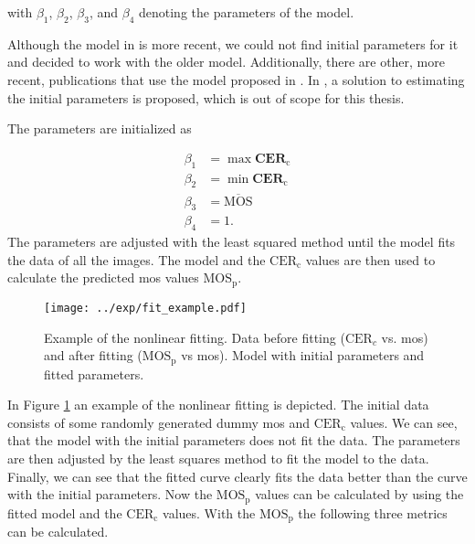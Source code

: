 with $\beta_{1}$, $\beta_{2}$, $\beta_{3}$, and $\beta_{4}$ denoting the parameters of the model.

Although the model in \cite{nonlin_fit_original_2003} is more recent, we could not find initial parameters for it and decided to work with the older model.
Additionally, there are other, more recent, publications \cite{ni_esim_2017, nonlin_fit_appl_2017, nonlin_fit_appl_2018, nonlin_fit_appl_2014, fsim_2011, nonlin_fit_appl_2015, doc_quality_survey_2023, iqa_database_2023, nonlin_fit_appl_2016} that use the model proposed in \cite{nonlin_fit_new_model_2006}.
In \cite{nonlin_fit_init_proof_2017}, a solution to estimating the initial parameters is proposed, which is out of scope for this thesis.


The parameters are initialized as
 
\begin{equation}
    \begin{aligned}
        \beta_{1} &= \max{\mathbf{CER}_{\text{c}}} \\
        \beta_{2} &= \min{\mathbf{CER}_{\text{c}}} \\
        \beta_{3} &= \overline{\text{MOS}} \\
        \beta_{4} &= 1.
    \end{aligned}
    \label{eq:nonlinear_init}
\end{equation}
The parameters are adjusted with the least squared method until the model fits the data of all the images.
The model and the $\text{CER}_{\text{c}}$ values are then used to calculate the predicted \gls{mos} values $\text{MOS}_{\text{p}}$.

\begin{figure}[h]
    \centering
    \texttt{[image: ../exp/fit\_example.pdf]}
    \caption{Example of the nonlinear fitting. Data before fitting ($\text{CER}_{c}$ vs. \gls{mos}) and after fitting ($\text{MOS}_{\text{p}}$ vs \gls{mos}). Model with initial parameters and fitted parameters.}
    \label{fig:nonlinear_fit}
\end{figure}

In Figure \ref{fig:nonlinear_fit} an example of the nonlinear fitting is depicted.
The initial data consists of some randomly generated dummy \gls{mos} and $\text{CER}_{\text{c}}$ values.
We can see, that the model with the initial parameters does not fit the data.
The parameters are then adjusted by the least squares method \cite{least_squares_1978} to fit the model to the data.
Finally, we can see that the fitted curve clearly fits the data better than the curve with the initial parameters.
Now the $\text{MOS}_{\text{p}}$ values can be calculated by using the fitted model and the $\text{CER}_{\text{c}}$ values.
With the $\text{MOS}_{\text{p}}$ the following three metrics \cite{iqa_survey_2021} can be calculated.

